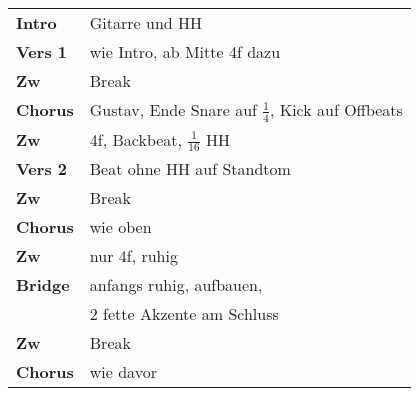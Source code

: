 
\begin{tabular}{p{1.6cm}l}
	\textbf{Intro}  & Gitarre und HH                                          \\
	\textbf{Vers 1} & wie Intro, ab Mitte 4f dazu                             \\
	\textbf{Zw}     & Break                                                   \\
	\textbf{Chorus} & Gustav, Ende Snare auf $\frac{1}{4}$, Kick auf Offbeats \\
	\textbf{Zw}     & 4f, Backbeat, $\frac{1}{16}$ HH                         \\
	\textbf{Vers 2} & Beat ohne HH auf Standtom                               \\
	\textbf{Zw}     & Break                                                   \\
	\textbf{Chorus} & wie oben                                                \\
	\textbf{Zw}     & nur 4f, ruhig                                           \\
	\textbf{Bridge} & anfangs ruhig, aufbauen,                                \\
	                & 2 fette Akzente am Schluss                              \\
	\textbf{Zw}     & Break                                                   \\
	\textbf{Chorus} & wie davor                                               \\
\end{tabular}
